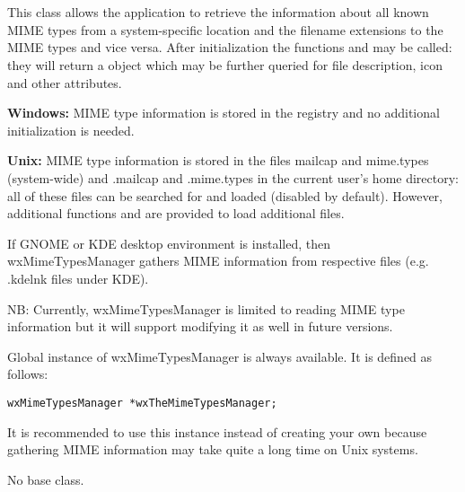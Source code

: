 \section{}\label{wxmimetypesmanager}

This class allows the application to retrieve the information about all known
MIME types from a system-specific location and the filename extensions to the
MIME types and vice versa. After initialization the functions
and  
may be called: they will return a  object which
may be further queried for file description, icon and other attributes.

{\bf Windows:} MIME type information is stored in the registry and no additional
initialization is needed.

{\bf Unix:} MIME type information is stored in the files mailcap and mime.types
(system-wide) and .mailcap and .mime.types in the current user's home directory:
all of these files can be searched for and loaded (disabled by default). However,
additional functions 
 and 
 are
provided to load additional files.

If GNOME or KDE desktop environment is installed, then wxMimeTypesManager 
gathers MIME information from respective files (e.g. .kdelnk files under KDE).

NB: Currently, wxMimeTypesManager is limited to reading MIME type information
but it will support modifying it as well in future versions.


Global instance of wxMimeTypesManager is always available. It is defined
as follows:

\begin{verbatim}
wxMimeTypesManager *wxTheMimeTypesManager;
\end{verbatim}

It is recommended to use this instance instead of creating your own because
gathering MIME information may take quite a long time on Unix systems.


No base class.

